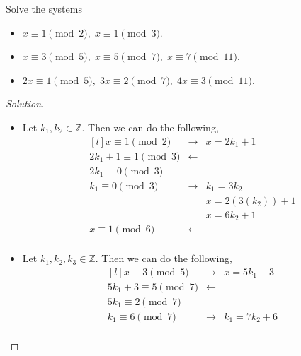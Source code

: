 \documentclass[11pt]{article}
\newcommand{\Z}{\mathbb{Z}}
\newenvironment{problem}[2][Problem]{\begin{trivlist}
\item[\hskip \labelsep {\bfseries #1}\hskip \labelsep {\bfseries #2.}]}{\end{trivlist}}
\newenvironment{solution}
  {\renewcommand\qedsymbol{$~$}\begin{proof}[Solution]$ $\par\nobreak\ignorespaces}
  {\end{proof}}
\begin{document}
\begin{problem}{3}
Solve the systems
\begin{itemize}
    \item [(a)] $x\equiv 1 \pmod{2},\; x\equiv 1 \pmod{3}$.
    \item [(b)] $x\equiv 3 \pmod{5}, \; x\equiv 5\pmod{7}, \; x \equiv 7 \pmod{11}$.
    \item [(c)] $2x\equiv 1 \pmod{5}, \; 3x\equiv 2 \pmod{7}, \; 4x\equiv 3 \pmod{11}$.
\end{itemize}
\end{problem}

\begin{solution}
    \begin{itemize}
        \item [(a)] Let $k_1, k_2\in \Z$. Then we can do the following,
              \[
                  \begin{matrix*}[l]
                      x \equiv 1 \pmod{2}        & \rightarrow & x= 2k_1 + 1      \\
                      2k_1 + 1 \equiv 1 \pmod{3} & \leftarrow  &                  \\
                      2k_1 \equiv 0 \pmod{3}     &                                \\
                      k_1 \equiv 0 \pmod{3}      & \rightarrow & k_1 = 3k_2       \\
                      &             & x= 2(3(k_2)) + 1 \\
                      &             & x= 6k_2 + 1      \\
                      x \equiv 1 \pmod{6}        & \leftarrow  &                  \\
                  \end{matrix*}
              \]
        \item [(b)] Let $k_1, k_2, k_3 \in \Z$. Then we can do the following,
              \[
                  \begin{matrix*}[l]
                      x \equiv 3 \pmod{5}           & \rightarrow & x= 5k_1 + 3           \\
                      5k_1 + 3 \equiv 5 \pmod{7}    & \leftarrow  &                       \\
                      5k_1 \equiv 2 \pmod{7}        &             &                       \\
                      k_1 \equiv 6 \pmod{7}         & \rightarrow & k_1= 7k_2 + 6         \\

\end{matrix*}\]
\end{itemize}
\end{solution}
\end{document}
